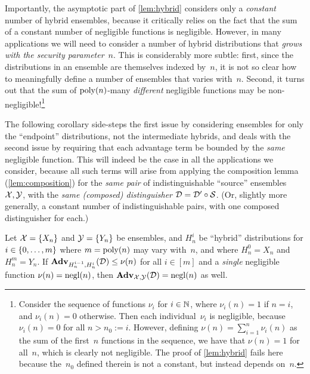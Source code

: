 \documentclass[11pt]{article}
\begin{document}
Importantly, the asymptotic part of \cref{lem:hybrid} considers only a \emph{constant} number of hybrid ensembles, because it critically relies on the fact that the sum of a constant number of negligible functions is negligible.
However, in many applications we will need to consider a number of hybrid distributions that \emph{grows with the security parameter}~$n$.
This is considerably more subtle: first, since the distributions in an ensemble are themselves indexed by~$n$, it is not so clear how to meaningfully define a number of ensembles that varies with~$n$.
Second, it turns out that the sum of $\operatorname{poly}(n)$-many \emph{different} negligible functions may be non-negligible!\footnote{Consider the sequence of functions $\nu_{i}$ for $i \in \mathbb{N}$, where $\nu_{i}(n) = 1$ if $n=i$, and $\nu_{i}(n)=0$ otherwise.
  Then each individual~$\nu_{i}$ is negligible, because $\nu_{i}(n) = 0$ for all $n > n_{0} := i$.
  However, defining $\nu(n) = \sum_{i=1}^{n} \nu_{i}(n)$ as the sum of the first~$n$ functions in the sequence, we have that $\nu(n) = 1$ for all~$n$, which is clearly not negligible.
  The proof of \cref{lem:hybrid} fails here because the~$n_{0}$ defined therein is not a constant, but instead depends on~$n$.}

The following corollary side-steps the first issue by considering ensembles for only the ``endpoint'' distributions, not the intermediate hybrids, and deals with the second issue by requiring that each advantage term be bounded by the \emph{same} negligible function.
This will indeed be the case in all the applications we consider, because all such terms will arise from applying the composition lemma (\cref{lem:composition}) for the \emph{same pair} of indistinguishable ``source'' ensembles $\mathcal{X},\mathcal{Y}$, with the \emph{same (composed) distinguisher} $\mathcal{D} = \mathcal{D}' \circ \mathcal{S}$.
(Or, slightly more generally, a constant number of indistinguishable pairs, with one composed distinguisher for each.)

\begin{corollary}
  \label{cor:hybrid-poly}
  Let $\mathcal{X} = \{X_{n}\}$ and $\mathcal{Y} = \{Y_{n}\}$ be ensembles, and $H^{i}_{n}$ be ``hybrid'' distributions for $i \in \{0, \ldots, m\}$ where $m=\operatorname{poly}(n)$ may vary with~$n$, and where $H^{0}_{n} = X_{n}$ and $H^{m}_{n} = Y_{n}$.
  If $\mathbf{Adv}_{H_{n}^{i-1},H_{n}^{i}}(\mathcal{D}) \leq \nu(n)$ for all $i \in [m]$ and a \emph{single} negligible function $\nu(n) = \operatorname{negl}(n)$, then $\mathbf{Adv}_{\mathcal{X},\mathcal{Y}}(\mathcal{D}) = \operatorname{negl}(n)$ as well.
\end{corollary}
\end{document}

